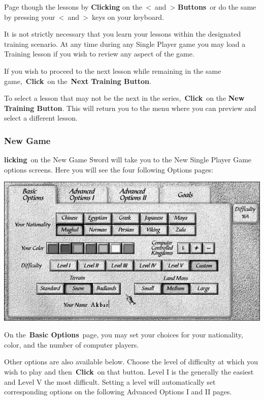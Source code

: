 Page though the lessons by \textbf{Clicking} on the \textless and \textgreater \hspace{1pt} \textbf{Buttons} or do the same by pressing your \textless and \textgreater keys on your keyboard.

It is not strictly necessary that you learn your lessons within the designated training scenario. At any time during any Single Player game you may load a Training lesson if you wish to review any aspect of the game.

If you wish to proceed to the next lesson while remaining in the same game, \textbf{Click} on the \textbf{Next Training Button}.

To select a lesson that may not be the next in the series, \textbf{Click} on the \textbf{New Training Button}. This will return you to the menu where you can preview and select a different lesson.

\subsubsection{New Game}

\textbf{licking} on the New Game Sword will take you to the New Single Player Game options screens. Here you will see the four following Options pages:

\begin{center}
	\includegraphics[width=0.9\linewidth]{Ibasicoptions}
\end{center}

On the \textbf{Basic Options} page, you may set your choices for your nationality, color, and the number of computer players.

Other options are also available below. Choose the level of difficulty at which you wish to play and then \textbf{Click} on that button. Level I is the generally the easiest and Level V the most difficult. Setting a level will automatically set corresponding options on the following Advanced Options I and II pages.

